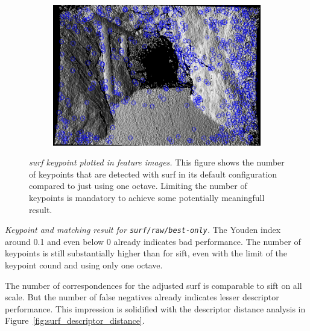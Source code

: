 \begin{figure}[H]
\begin{subfigure}[t]{0.25\linewidth}
\end{subfigure}%
\begin{subfigure}[t]{0.25\linewidth}
    \includegraphics[width=\linewidth]{chapter06/results/SURF/bearing/oneoctave_kp0005.png}%
\end{subfigure}%
\caption[\acrshort{surf} keypoint plotted in feature images]{\emph{\acrshort{surf} keypoint plotted in feature images.} This figure shows the number of keypoints that are detected with \acrshort{surf} in its default configuration compared to just using one octave. Limiting the number of keypoints is mandatory to achieve some potentially meaningfull result.}\label{fig:surf_keypoints_mess}
\end{figure}
\begin{table}[H]
    {\renewcommand{\arraystretch}{1.2}%
    \setlength{\tabcolsep}{0.3em}%

    }
    \caption[Keypoint and matching result for \texttt{\acrshort{surf}/raw/best-only}]{\emph{Keypoint and matching result for \texttt{\acrshort{surf}/raw/best-only}.} The Youden index around 0.1 and even below 0 already indicates bad performance. The number of keypoints is still substantially higher than for \acrshort{sift}, even with the limit of the keypoint cound and using only one octave.}\label{tab:surf_results}
\end{table}
The number of correspondences for the adjusted \acrshort{surf} is comparable to \acrshort{sift} on all scale.
But the number of false negatives already indicates lesser descriptor performance.
This impression is solidified with the descriptor distance analysis in Figure~\ref{fig:surf_descriptor_distance}.
